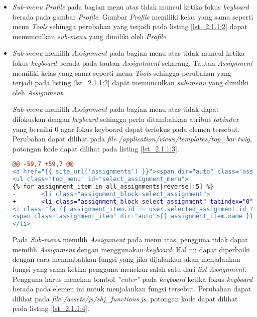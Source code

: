 \begin{itemize}
	\item \textit{Sub-menu} \textit{Profile} pada bagian menu atas tidak muncul ketika fokus \textit{keyboard} berada pada gambar \textit{Profile}. Gambar \textit{Profile} memiliki kelas yang sama seperti menu \textit{Tools} sehingga perubahan yang terjadi pada listing \ref{lst_2.1.1:2} dapat memunculkan \textit{sub-menu} yang dimiliki oleh \textit{Profile}.
	
	\item \textit{Sub-menu} memilih \textit{Assignment} pada bagian menu atas tidak muncul ketika fokus \textit{keyboard} berada pada tautan \textit{Assigntment} sekarang. Tautan \textit{Assignment} memiliki kelas yang sama seperti menu \textit{Tools} sehingga perubahan yang terjadi pada listing \ref{lst_2.1.1:2} dapat memunculkan \textit{sub-menu} yang dimiliki oleh \textit{Assignment}.
	
	\textit{Sub-menu} memilih \textit{Assignment} pada bagian menu atas tidak dapat difokuskan dengan \textit{keyboard} sehingga perlu ditambahkan atribut \textit{tabindex} yang bernilai 0 agar fokus keyboard dapat terfokus pada elemen tersebut. Perubahan dapat dilihat pada \textit{file} \textit{/application/views/templates/top\_bar.twig}, potongan kode dapat dilihat pada listing \ref{lst_2.1.1:3}.
	
\begin{lstlisting}[language=diff, caption=Perubahan pada \textit{file} \textit{top\_bar.twig}, label=lst_2.1.1:3, basicstyle=\ttfamily, frame=single,
columns=fullflexible, keepspaces=true, breaklines=true]
@@ -59,7 +59,7 @@
<a href="{{ site_url('assignments') }}"><span dir="auto" class="assignment_name">{{ user.selected_assignment.name|length > 30 ? user.selected_assignment.name|slice(0, 30) ~ '...' : user.selected_assignment.name }}</span></a>
<ul class="top_menu" id="select_assignment_menu">
{% for assignment_item in all_assignments|reverse[:5] %}
- 		<li class="assignment_block select_assignment">
+  		<li class="assignment_block select_assignment" tabindex="0">
<i class="fa {{ assignment_item.id == user.selected_assignment.id ? 'fa-check-square-o color6' : 'fa-square-o' }}" data-id="{{ assignment_item.id }}"></i>
<span class="assignment_item" dir="auto">{{ assignment_item.name }}</span>
</li>
\end{lstlisting}

	Pada \textit{Sub-menu} memilih \textit{Assignment} pada menu atas, pengguna tidak dapat memilih \textit{Assignment} dengan menggunakan \textit{keyboard}. Hal ini dapat diperbaiki dengan cara menambahkan fungsi yang jika dijalankan akan menjalankan fungsi yang sama ketika pengguna menekan salah satu dari \textit{list} \textit{Assignment}. Pengguna harus menekan tombol \textit{''enter''} pada \textit{keyboard} ketika fokus \textit{keyboard} berada pada elemen ini untuk menjalankan fungsi tersebut. Perubahan dapat dilihat pada \textit{file} \textit{/assets/js/shj\_functions.js}, potongan kode dapat dilihat pada listing \ref{lst_2.1.1:4}.
	

\end{itemize}
